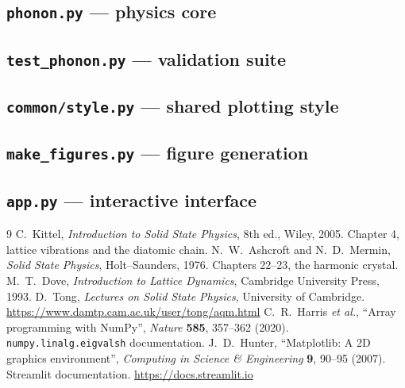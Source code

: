 \documentclass[aps,prb,reprint,nofootinbib]{revtex4-2}
\begin{document}
\subsection{\texttt{phonon.py} --- physics core}


\subsection{\texttt{test\_phonon.py} --- validation suite}


\subsection{\texttt{common/style.py} --- shared plotting style}


\subsection{\texttt{make\_figures.py} --- figure generation}


\subsection{\texttt{app.py} --- interactive interface}


\twocolumngrid

\begin{thebibliography}{9}
 C.~Kittel, \textit{Introduction to Solid State Physics}, 8th ed., Wiley, 2005.
  Chapter 4, lattice vibrations and the diatomic chain.
 N.~W.~Ashcroft and N.~D.~Mermin, \textit{Solid State Physics},
  Holt--Saunders, 1976. Chapters 22--23, the harmonic crystal.
 M.~T.~Dove, \textit{Introduction to Lattice Dynamics}, Cambridge University
  Press, 1993.
 D.~Tong, \textit{Lectures on Solid State Physics}, University of Cambridge.
  \url{https://www.damtp.cam.ac.uk/user/tong/aqm.html}
 C.~R.~Harris \textit{et al.}, ``Array programming with NumPy'',
  \textit{Nature} \textbf{585}, 357--362 (2020). \texttt{numpy.linalg.eigvalsh} documentation.
 J.~D.~Hunter, ``Matplotlib: A 2D graphics environment'',
  \textit{Computing in Science \& Engineering} \textbf{9}, 90--95 (2007).
 Streamlit documentation. \url{https://docs.streamlit.io}
\end{thebibliography}
\end{document}
